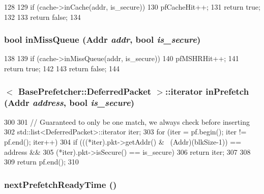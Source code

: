 \begin{DoxyCode}
128 {
129     if (cache->inCache(addr, is_secure)) {
130         pfCacheHit++;
131         return true;
132     }
133     return false;
134 }
\end{DoxyCode}
\hypertarget{classBasePrefetcher_a7101ac3ce053ea800e49a4ff44c84ca0}{
\subsubsection[{inMissQueue}]{\setlength{\rightskip}{0pt plus 5cm}bool inMissQueue ({\bf Addr} {\em addr}, \/  bool {\em is\_\-secure})}}
\label{classBasePrefetcher_a7101ac3ce053ea800e49a4ff44c84ca0}



\begin{DoxyCode}
138 {
139     if (cache->inMissQueue(addr, is_secure)) {
140         pfMSHRHit++;
141         return true;
142     }
143     return false;
144 }
\end{DoxyCode}
\hypertarget{classBasePrefetcher_a50ff64f84defcdcd4e1ecc3f7df52af1}{
\subsubsection[{inPrefetch}]{$<$ {\bf BasePrefetcher::DeferredPacket} $>$::iterator inPrefetch ({\bf Addr} {\em address}, \/  bool {\em is\_\-secure})}}
\label{classBasePrefetcher_a50ff64f84defcdcd4e1ecc3f7df52af1}



\begin{DoxyCode}
300 {
301     // Guaranteed to only be one match, we always check before inserting
302     std::list<DeferredPacket>::iterator iter;
303     for (iter = pf.begin(); iter != pf.end(); iter++) {
304         if (((*iter).pkt->getAddr() & ~(Addr)(blkSize-1)) == address &&
305             (*iter).pkt->isSecure() == is_secure) {
306             return iter;
307         }
308     }
309     return pf.end();
310 }
\end{DoxyCode}
\hypertarget{classBasePrefetcher_a7b66a659d072bb2b2e105351949f7b2e}{
\subsubsection[{nextPrefetchReadyTime}]{ nextPrefetchReadyTime ()}}
\label{classBasePrefetcher_a7b66a659d072bb2b2e105351949f7b2e}



